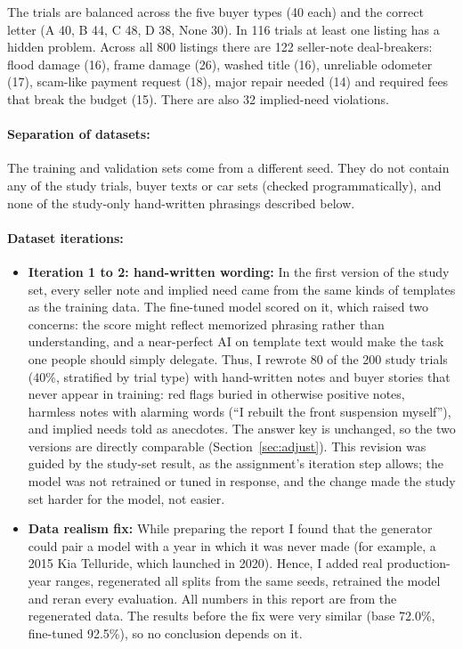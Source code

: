 \documentclass[11pt]{article}
\begin{document}
The trials are balanced across the five buyer types (40 each) and the correct letter (A 40, B 44,
C 48, D 38, None 30). In 116 trials at least one listing has a hidden problem. Across all 800
listings there are 122 seller-note deal-breakers: flood damage (16), frame damage (26), washed
title (16), unreliable odometer (17), scam-like payment request (18), major repair needed (14)
and required fees that break the budget (15). There are also 32 implied-need violations.

\paragraph{Separation of datasets:} The training and validation sets come from a different seed. They do not contain any of the study trials, buyer texts or car sets (checked programmatically), and none of the
study-only hand-written phrasings described below.

\paragraph{Dataset iterations:}
\begin{itemize}
  \item \textbf{Iteration 1 to 2: hand-written wording:} In the first version of the study set,
  every seller note and implied need came from the same kinds of templates as the training data.
  The fine-tuned model scored \FtAccOne{} on it, which raised two concerns: the score might reflect
  memorized phrasing rather than understanding, and a near-perfect AI on template text would make
  the task one people should simply delegate. Thus, I rewrote 80 of the 200 study trials
  (40\%, stratified by trial type) with hand-written notes and buyer stories that never appear in
  training: red flags buried in otherwise positive notes, harmless notes with alarming words (``I
  rebuilt the front suspension myself''), and implied needs told as anecdotes. The answer key is
  unchanged, so the two versions are directly comparable (Section~\ref{sec:adjust}). This revision
  was guided by the study-set result, as the assignment's iteration step allows; the model was not
  retrained or tuned in response, and the change made the study set harder for the model, not
  easier.
  \item \textbf{Data realism fix:} While preparing the report I found that the generator could pair
  a model with a year in which it was never made (for example, a 2015 Kia Telluride, which launched
  in 2020). Hence, I added real production-year ranges,
  regenerated all splits from the same seeds, retrained the model and reran every evaluation. All
  numbers in this report are from the regenerated data. The results before the fix were very similar
  (base 72.0\%, fine-tuned 92.5\%), so no conclusion depends on it.
\end{itemize}
\end{document}
